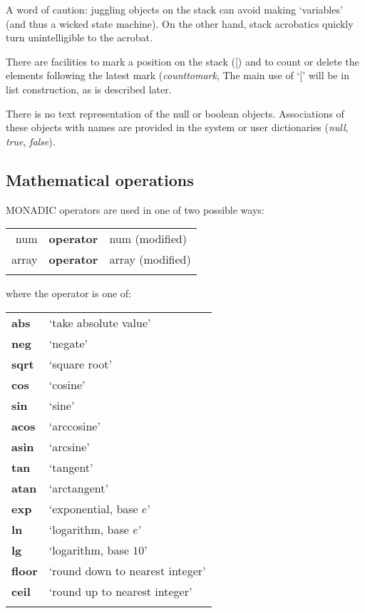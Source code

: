 A word of caution: juggling objects on the stack can avoid making `variables' (and thus a wicked state machine). On the other hand, stack acrobatics quickly turn unintelligible to the acrobat. 

There are facilities to mark a position on the stack ([) and to count  or delete the elements following the latest mark (\emph{counttomark}, The main use of `[' will be in list construction, as is described later.

There  is no text representation of the null or  boolean  objects. Associations of these objects with names are provided in the system or user dictionaries (\emph{null}, \emph{true}, \emph{false}). 

\subsection{Mathematical operations}\label{ssec:mathops}

MONADIC operators are used in one of two possible ways:

\begin{tabular}{>{\sffamily}r>{\sffamily\bfseries}l>{\sffamily}l} 
num & operator & num (modified)\\
array & operator & array (modified)\\\\
\end{tabular}

\noindent where the operator is one of:

\begin{supertabular}{>{\sffamily\bfseries}l>{\normalfont}l}
abs   & `take absolute value'\\
neg   & `negate'\\
sqrt  & `square root'\\
cos   & `cosine'\\
sin   & `sine'\\
acos  & `arccosine'\\
asin  & `arcsine'\\
tan   & `tangent'\\
atan  & `arctangent'\\
exp   & `exponential, base $e$'\\
ln    & `logarithm, base $e$'\\
lg    & `logarithm, base $10$'\\
floor & `round down to nearest integer'\\
ceil  & `round up to nearest integer'\\\\
\end{supertabular}

